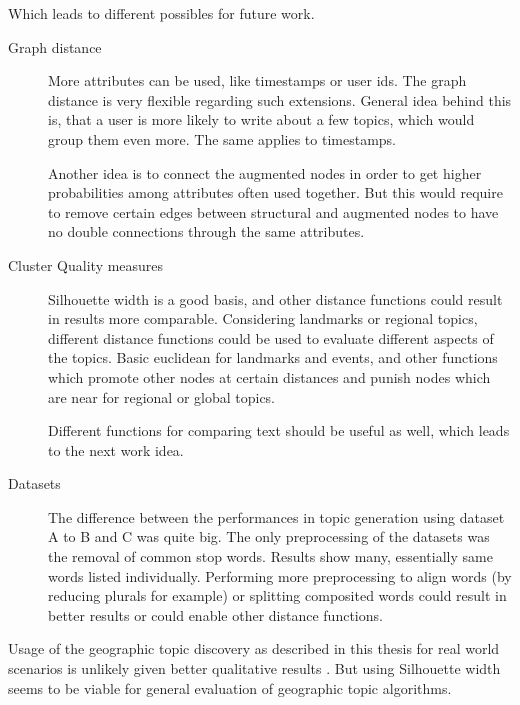Which leads to different possibles for future work.
\begin{description}
\item[Graph distance] More attributes can be used, like timestamps or user ids. The graph distance is very flexible regarding such extensions. General idea behind this is, that a user is more likely to write about a few topics, which would group them even more. The same applies to timestamps.

Another idea is to connect the augmented nodes in order to get higher probabilities among attributes often used together. But this would require to remove certain edges between structural and augmented nodes to have no double connections through the same attributes.

\item[Cluster Quality measures] Silhouette width is a good basis, and other distance functions could result in results more comparable. Considering landmarks or regional topics, different distance functions could be used to evaluate different aspects of the topics. Basic euclidean for landmarks and events, and other functions which promote other nodes at certain distances and punish nodes which are near for regional or global topics.

Different functions for comparing text should be useful as well, which leads to the next work idea.

\item[Datasets] The difference between the performances in topic generation using dataset A to B and C was quite big. The only preprocessing of the datasets was the removal of common stop words. Results show many, essentially same words listed individually. Performing more preprocessing to align words (by reducing plurals for example) or splitting composited words could result in better results or could enable other distance functions.
\end{description}
%
Usage of the geographic topic discovery as described in this thesis for real world scenarios is unlikely given better qualitative results \cite{Sengstock2012a, Yin2011, Hong2012}. But using Silhouette width seems to be viable for general evaluation of geographic topic algorithms.